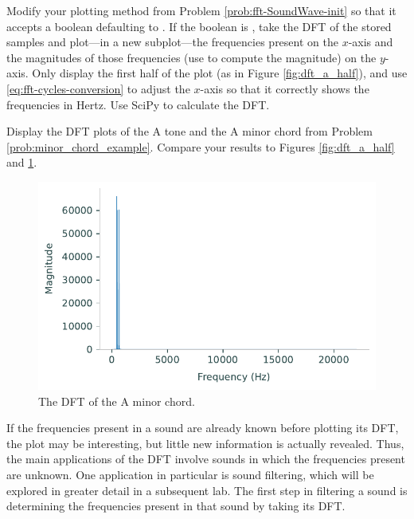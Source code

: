 
\begin{problem} %
Modify your  plotting method from Problem \ref{prob:fft-SoundWave-init} so that it accepts a boolean defaulting to .
If the boolean is , take the DFT of the stored samples and plot---in a new subplot---the frequencies present on the $x$-axis and the magnitudes of those frequencies (use  to compute the magnitude) on the $y$-axis.
Only display the first half of the plot (as in Figure \ref{fig:dft_a_half}), and use \eqref{eq:fft-cycles-conversion} to adjust the $x$-axis so that it correctly shows the frequencies in Hertz.
Use SciPy to calculate the DFT.

Display the DFT plots of the A tone and the A minor chord from Problem \ref{prob:minor_chord_example}.
Compare your results to Figures \ref{fig:dft_a_half} and \ref{fig:dft_chord}.
\end{problem}

\begin{figure}[H] %
\centering
\includegraphics[width=.7\textwidth]{figures/dft_chord.pdf}
\caption{The DFT of the A minor chord.}
\label{fig:dft_chord}
\end{figure}

If the frequencies present in a sound are already known before plotting its DFT, the plot may be interesting, but little new information is actually revealed.
Thus, the main applications of the DFT involve sounds in which the frequencies present are unknown.
One application in particular is sound filtering, which will be explored in greater detail in a subsequent lab.
The first step in filtering a sound is determining the frequencies present in that sound by taking its DFT.

